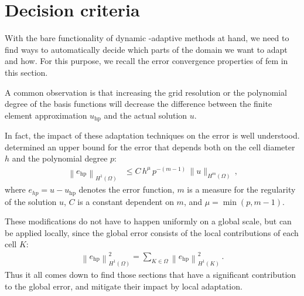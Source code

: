 \section{Decision criteria}
\label{sec:decision}

With the bare functionality of dynamic \hp-adaptive methods at hand, we need to find ways to automatically decide which parts of the domain we want to adapt and how. For this purpose, we recall the error convergence properties of \gls{fem} in this section.

A common observation is that increasing the grid resolution or the polynomial degree of the basis functions will decrease the difference between the finite element approximation $u_\text{hp}$ and the actual solution $u$.

In fact, the impact of these adaptation techniques on the error is well understood. \textcite[Thm.~3.4]{babuska1990} determined an upper bound for the error that depends both on the cell diameter $h$ and the polynomial degree $p$:
\begin{align}
\label{eq:errorbound_hp} \left\|e_\text{hp}\right\|_{H^{1}(\Omega)} &\leq C \, h^{\mu} \, p^{-(m-1)} \, \|u\|_{H^{m}(\Omega)} \,\text{,}
\end{align}
where $e_{hp} = u - u_\text{hp}$ denotes the error function, $m$ is a measure for the regularity of the solution $u$, $C$ is a constant dependent on $m$, and $\mu = \min \left(p, m - 1\right)$.

These modifications do not have to happen uniformly on a global scale, but can be applied locally, since the global error consists of the local contributions of each cell $K$:
\begin{align}
\label{eq:error_sum} \left\|e_\text{hp}\right\|_{H^1(\Omega)}^2 = \sum\limits_{K \in \Omega} \left\|e_\text{hp}\right\|_{H^1(K)}^2 \,\text{.}
\end{align}
Thus it all comes down to find those sections that have a significant contribution to the global error, and mitigate their impact by local adaptation.

